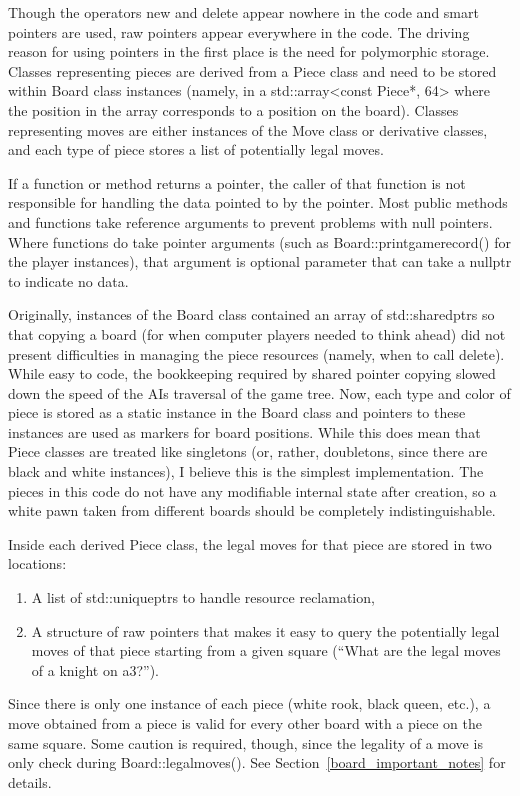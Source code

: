 \documentclass[letterpaper]{article}
\newcommand{\code}[1]{\small\textsf{#1}}
\renewcommand{\_}{\allowbreak\textunderscore\allowbreak}
\begin{document}
Though the operators \code{new} and \code{delete} appear nowhere in the code and smart pointers are used, raw pointers appear everywhere in the code. The driving reason for using pointers in the first place is the need for polymorphic storage. Classes representing pieces are derived from a \code{Piece} class and need to be stored within \code{Board} class instances (namely, in a \code{std::array<const Piece*, 64>} where the position in the array corresponds to a position on the board). Classes representing moves are either instances of the \code{Move} class or derivative classes, and each type of piece stores a list of potentially legal moves.

If a function or method returns a pointer, the caller of that function is not responsible for handling the data pointed to by the pointer. Most public methods and functions take reference arguments to prevent problems with null pointers. Where functions do take pointer arguments (such as \code{Board::print\_game\_record()} for the player instances), that argument is optional parameter that can take a \code{nullptr} to indicate no data.

Originally, instances of the \code{Board} class contained an array of \code{std::shared\_ptr}s so that copying a board (for when computer players needed to think ahead) did not present difficulties in managing the piece resources (namely, when to call \code{delete}). While easy to code, the bookkeeping required by shared pointer copying slowed down the speed of the AIs traversal of the game tree. Now, each type and color of piece is stored as a static instance in the \code{Board} class and pointers to these instances are used as markers for board positions. While this does mean that \code{Piece} classes are treated like singletons (or, rather, doubletons, since there are black and white instances), I believe this is the simplest implementation. The pieces in this code do not have any modifiable internal state after creation, so a white pawn taken from different boards should be completely indistinguishable.

Inside each derived \code{Piece} class, the legal moves for that piece are stored in two locations:
\begin{enumerate}
	\item A list of \code{std::unique\_ptr}s to handle resource reclamation,
	\item A structure of raw pointers that makes it easy to query the potentially legal moves of that piece starting from a given square (``What are the legal moves of a knight on a3?'').
\end{enumerate}
Since there is only one instance of each piece (white rook, black queen, etc.), a move obtained from a piece is valid for every other board with a piece on the same square. Some caution is required, though, since the legality of a move is only check during \code{Board::legal\_moves()}. See Section~\ref{board_important_notes} for details.
\end{document}
